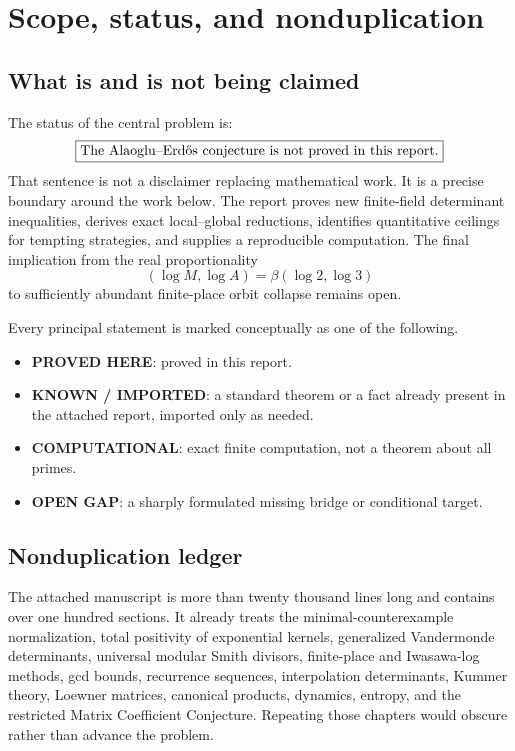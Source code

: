\documentclass[11pt]{article}
\theoremstyle{definition}
\theoremstyle{remark}
\newcommand{\statusproved}{\textcolor{statusgreen}{\textbf{PROVED HERE}}}
\newcommand{\statusknown}{\textcolor{statusblue}{\textbf{KNOWN / IMPORTED}}}
\newcommand{\statuscompute}{\textcolor{statusorange}{\textbf{COMPUTATIONAL}}}
\newcommand{\statusopen}{\textcolor{statusred}{\textbf{OPEN GAP}}}
\begin{document}
\tableofcontents
\newpage

\section{Scope, status, and nonduplication}

\subsection{What is and is not being claimed}

The status of the central problem is:
\[
\boxed{\text{The Alaoglu--Erd\H{o}s conjecture is not proved in this report.}}
\]
That sentence is not a disclaimer replacing mathematical work.  It is a precise boundary around the work below.  The report proves new finite-field determinant inequalities, derives exact local--global reductions, identifies quantitative ceilings for tempting strategies, and supplies a reproducible computation.  The final implication from the real proportionality
\[
(\log M,\log A)=\beta(\log2,\log3)
\]
to sufficiently abundant finite-place orbit collapse remains open.

Every principal statement is marked conceptually as one of the following.
\begin{itemize}
\item \statusproved: proved in this report.
\item \statusknown: a standard theorem or a fact already present in the attached report, imported only as needed.
\item \statuscompute: exact finite computation, not a theorem about all primes.
\item \statusopen: a sharply formulated missing bridge or conditional target.
\end{itemize}

\subsection{Nonduplication ledger}

The attached manuscript is more than twenty thousand lines long and contains over one hundred sections.  It already treats the minimal-counterexample normalization, total positivity of exponential kernels, generalized Vandermonde determinants, universal modular Smith divisors, finite-place and Iwasawa-log methods, gcd bounds, recurrence sequences, interpolation determinants, Kummer theory, Loewner matrices, canonical products, dynamics, entropy, and the restricted Matrix Coefficient Conjecture.  Repeating those chapters would obscure rather than advance the problem.
\end{document}
